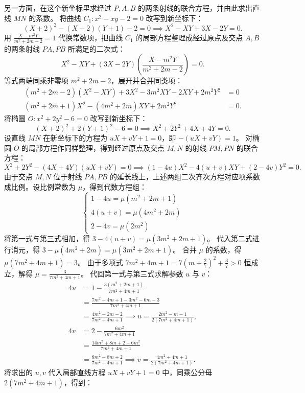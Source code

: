 \begin{solution}
另一方面，在这个新坐标里求经过 $P,A,B$ 的两条射线的联合方程，并由此求出直线 $MN$ 的系数。
将曲线 $C_1: x^2 - xy - 2 = 0$ 改写到新坐标下：
\[ (X + 2)^2 - (X + 2)(Y + 1) - 2 = 0 \implies X^2 - XY + 3X - 2Y = 0. \]
用 $\frac{X - m^2Y}{m^2 + 2m - 2} = 1$ 代换常数项，把曲线 $C_1$ 的局部方程整理成经过原点及交点 $A, B$ 的两条射线 $PA, PB$ 所满足的二次式：
\[ X^2 - XY + (3X - 2Y)\left(\frac{X - m^2Y}{m^2 + 2m - 2}\right) = 0. \]
等式两端同乘非零项 $m^2 + 2m - 2$，展开并合并同类项：
\begin{align*}
(m^2 + 2m - 2)(X^2 - XY) + 3X^2 - 3m^2XY - 2XY + 2m^2Y^2 &= 0 \\
(m^2 + 2m + 1)X^2 - (4m^2 + 2m)XY + 2m^2Y^2 &= 0.
\end{align*}
将椭圆 $O: x^2 + 2y^2 - 6 = 0$ 改写到新坐标下：
\[ (X + 2)^2 + 2(Y + 1)^2 - 6 = 0 \implies X^2 + 2Y^2 + 4X + 4Y = 0. \]
设直线 $MN$ 在新坐标下的方程为 $uX + vY + 1 = 0$，即 $-(uX + vY) = 1$。
对椭圆 $O$ 的局部方程作同样整理，得到经过原点及交点 $M, N$ 的射线 $PM, PN$ 的联合方程：
\[ X^2 + 2Y^2 - (4X + 4Y)(uX + vY) = 0 \implies (1 - 4u)X^2 - 4(u + v)XY + (2 - 4v)Y^2 = 0. \]
由于交点 $M, N$ 位于射线 $PA, PB$ 的延长线上，上述两组二次齐次方程对应项系数成比例。设比例常数为 $\mu$，得到代数方程组：
\[ \begin{cases} 1 - 4u = \mu(m^2 + 2m + 1) \\ 4(u + v) = \mu(4m^2 + 2m) \\ 2 - 4v = \mu(2m^2) \end{cases} \]
将第一式与第三式相加，得 $3 - 4(u + v) = \mu(3m^2 + 2m + 1)$。
代入第二式进行消元，得 $3 - \mu(4m^2 + 2m) = \mu(3m^2 + 2m + 1)$。
合并 $\mu$ 的系数，得 $\mu(7m^2 + 4m + 1) = 3$。
由于多项式 $7m^2 + 4m + 1 = 7\left(m + \frac{2}{7}\right)^2 + \frac{3}{7} > 0$ 恒成立，解得 $\mu = \frac{3}{7m^2 + 4m + 1}$。
代回第一式与第三式求解参数 $u$ 与 $v$：
\begin{align*}
4u &= 1 - \frac{3(m^2 + 2m + 1)}{7m^2 + 4m + 1} \\
&= \frac{7m^2 + 4m + 1 - 3m^2 - 6m - 3}{7m^2 + 4m + 1} \\
&= \frac{4m^2 - 2m - 2}{7m^2 + 4m + 1}
\implies u = \frac{2m^2 - m - 1}{2(7m^2 + 4m + 1)}, \\
4v &= 2 - \frac{6m^2}{7m^2 + 4m + 1} \\
&= \frac{14m^2 + 8m + 2 - 6m^2}{7m^2 + 4m + 1} \\
&= \frac{8m^2 + 8m + 2}{7m^2 + 4m + 1}
\implies v = \frac{4m^2 + 4m + 1}{2(7m^2 + 4m + 1)}.
\end{align*}
将求出的 $u, v$ 代入局部直线方程 $uX + vY + 1 = 0$ 中，同乘公分母 $2(7m^2 + 4m + 1)$，得到：

\end{solution}
